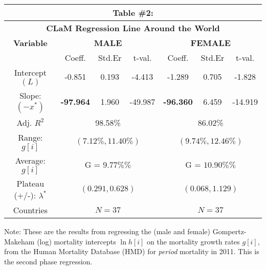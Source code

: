 \documentclass[12pt, titlepage]{article}%
\begin{document}
\clearpage
\begin{table}
\begin{center}
\begin{tabular}{||c||c|c|c|c|c|c||}\hline\hline
\multicolumn{7}{||c||}{Table \#2:} \\ \hline
\multicolumn{7}{||c||}{{\bf CLaM Regression Line Around the World}} \\ \hline
{\bf Variable} & \multicolumn{3}{|c|}{{\bf MALE}} & \multicolumn{3}{|c||}{{\bf FEMALE}} \\ \hline
& Coeff. & Std.Er & t-val. & Coeff. & Std.Er & t-val.  \\ \hline
Intercept $(L)$ & -0.851 & 0.193 & -4.413 & -1.289 & 0.705 & -1.828 \\ \hline
Slope: $(-x^{*})$ & {\bf-97.964} & 1.960 & -49.987 & {\bf-96.360} & 6.459 & -14.919 \\ \hline
Adj. $R^2$ & \multicolumn{3}{|c|}{98.58\%} & \multicolumn{3}{|c||}{86.02\%} \\ \hline
Range: $g[i]$ & \multicolumn{3}{|c|}{$(7.12\%, 11.40\%)$} & \multicolumn{3}{|c||}{$(9.74\%, 12.46\%)$} \\ \hline
Average: $g[i]$ & \multicolumn{3}{|c|}{G \; = \; $9.77\%\%$} & \multicolumn{3}{|c||}{G \; = \; $10.90\%\%$} \\ \hline
Plateau (+/-): $\lambda^{*}$ & \multicolumn{3}{|c|}{$ (0.291, 0.628)$} & \multicolumn{3}{|c||}{$ (0.068, 1.129)$} \\ \hline
Countries & \multicolumn{3}{|c|}{$N=37$} & \multicolumn{3}{|c||}{$N=37$} \\ \hline
\end{tabular}\label{tab3}\end{center}Note: These are the results from regressing the (male and female) Gompertz-Makeham (log) mortality intercepts $\ln h[i]$ on the mortality growth rates $g[i]$, from the Human Mortality Database (HMD) for {\em period} mortality in 2011. This is the second phase regression.
\end{table}
\end{document}
